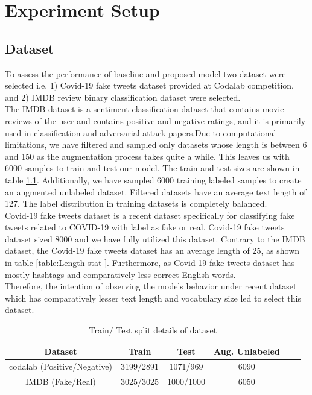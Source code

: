 \documentclass[%
	BCOR=8mm, %
	DIV=12,
	toc=bibliography, %
	toc=listof, %
	oneside, %
	egregdoesnotlikesansseriftitles, %
	]{scrbook}
\begin{document}
\chapter{Experiment Setup}
\label{chapter:experiment}

\section{Dataset}
\label{label:dataset}
To assess the performance of baseline and proposed model two dataset were selected i.e. 1) Covid-19  fake tweets dataset \cite{patwa_fighting_2021} provided at Codalab competition, and 2) IMDB review binary classification dataset were selected. \\
The IMDB dataset is a sentiment classification dataset\cite{maas_learning_2011-1} that contains movie reviews of the user and contains positive and negative ratings, and it is primarily used in classification and adversarial attack papers.Due to computational limitations, we have filtered and sampled only datasets whose length is between 6 and 150 as the augmentation process takes quite a while. This leaves us with 6000 samples to train and test our model. The train and test sizes are shown in table \ref{table:train/test table }. Additionally, we have sampled 6000 training labeled samples to create an augmented unlabeled dataset. Filtered datasets have an average text length of 127. The label distribution in training datasets is completely balanced.\\
Covid-19 fake tweets dataset is a recent dataset specifically for classifying fake tweets related to COVID-19 with label as fake or real. Covid-19 fake tweets dataset sized 8000 and we have fully utilized this dataset. Contrary to the IMDB dataset, the Covid-19  fake tweets dataset has an average length of 25, as shown in table \ref{table:Length stat }. Furthermore, as Covid-19  fake tweets dataset has mostly hashtags and comparatively less correct English words.\\
Therefore, the intention of observing the models behavior under recent dataset which has comparatively lesser text length and vocabulary size led to select this dataset.

\begin{table}[!h]
\centering
\begin{tabular}{ |c|c|c|c|c|c| }
\hline
Dataset & Train & Test  & Aug. Unlabeled \\
\hline
codalab (Positive/Negative) & 3199/2891 & 1071/969 & 6090 \\
\hline
IMDB (Fake/Real) & 3025/3025 & 1000/1000 & 6050  \\
\hline
\end{tabular}
\caption[Train/Augment test data]{Train/ Test split details of dataset }
\label{table:train/test table }
\end{table}
\end{document}
